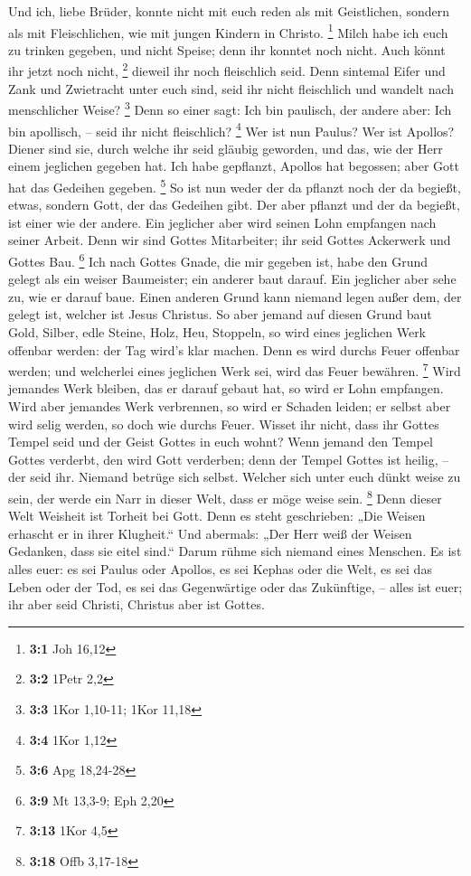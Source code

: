  Und ich, liebe Brüder, konnte nicht mit euch reden als
mit Geistlichen, sondern als mit Fleischlichen, wie mit jungen Kindern
in Christo. \footnote{\textbf{3:1} Joh 16,12}  Milch habe
ich euch zu trinken gegeben, und nicht Speise; denn ihr konntet noch
nicht. Auch könnt ihr jetzt noch nicht, \footnote{\textbf{3:2} 1Petr 2,2}
 dieweil ihr noch fleischlich seid. Denn sintemal Eifer
und Zank und Zwietracht unter euch sind, seid ihr nicht fleischlich und
wandelt nach menschlicher Weise? \footnote{\textbf{3:3} 1Kor 1,10-11;
  1Kor 11,18}  Denn so einer sagt: Ich bin paulisch, der
andere aber: Ich bin apollisch, -- seid ihr nicht fleischlich?
\footnote{\textbf{3:4} 1Kor 1,12}  Wer ist nun Paulus? Wer
ist Apollos? Diener sind sie, durch welche ihr seid gläubig geworden,
und das, wie der Herr einem jeglichen gegeben hat.  Ich
habe gepflanzt, Apollos hat begossen; aber Gott hat das Gedeihen
gegeben. \footnote{\textbf{3:6} Apg 18,24-28}  So ist nun
weder der da pflanzt noch der da begießt, etwas, sondern Gott, der das
Gedeihen gibt.  Der aber pflanzt und der da begießt, ist
einer wie der andere. Ein jeglicher aber wird seinen Lohn empfangen nach
seiner Arbeit.  Denn wir sind Gottes Mitarbeiter; ihr seid
Gottes Ackerwerk und Gottes Bau. \footnote{\textbf{3:9} Mt 13,3-9; Eph
  2,20}  Ich nach Gottes Gnade, die mir gegeben ist, habe
den Grund gelegt als ein weiser Baumeister; ein anderer baut darauf. Ein
jeglicher aber sehe zu, wie er darauf baue.  Einen
anderen Grund kann niemand legen außer dem, der gelegt ist, welcher ist
Jesus Christus.  So aber jemand auf diesen Grund baut
Gold, Silber, edle Steine, Holz, Heu, Stoppeln,  so wird
eines jeglichen Werk offenbar werden: der Tag wird's klar machen. Denn
es wird durchs Feuer offenbar werden; und welcherlei eines jeglichen
Werk sei, wird das Feuer bewähren. \footnote{\textbf{3:13} 1Kor 4,5}
 Wird jemandes Werk bleiben, das er darauf gebaut hat, so
wird er Lohn empfangen.  Wird aber jemandes Werk
verbrennen, so wird er Schaden leiden; er selbst aber wird selig werden,
so doch wie durchs Feuer.  Wisset ihr nicht, dass ihr
Gottes Tempel seid und der Geist Gottes in euch wohnt? 
Wenn jemand den Tempel Gottes verderbt, den wird Gott verderben; denn
der Tempel Gottes ist heilig, -- der seid ihr.  Niemand
betrüge sich selbst. Welcher sich unter euch dünkt weise zu sein, der
werde ein Narr in dieser Welt, dass er möge weise sein. \footnote{\textbf{3:18}
  Offb 3,17-18}  Denn dieser Welt Weisheit ist Torheit
bei Gott. Denn es steht geschrieben: „Die Weisen erhascht er in ihrer
Klugheit.``  Und abermals: „Der Herr weiß der Weisen
Gedanken, dass sie eitel sind.``  Darum rühme sich
niemand eines Menschen. Es ist alles euer:  es sei Paulus
oder Apollos, es sei Kephas oder die Welt, es sei das Leben oder der
Tod, es sei das Gegenwärtige oder das Zukünftige, -- alles ist euer;
 ihr aber seid Christi, Christus aber ist Gottes.

